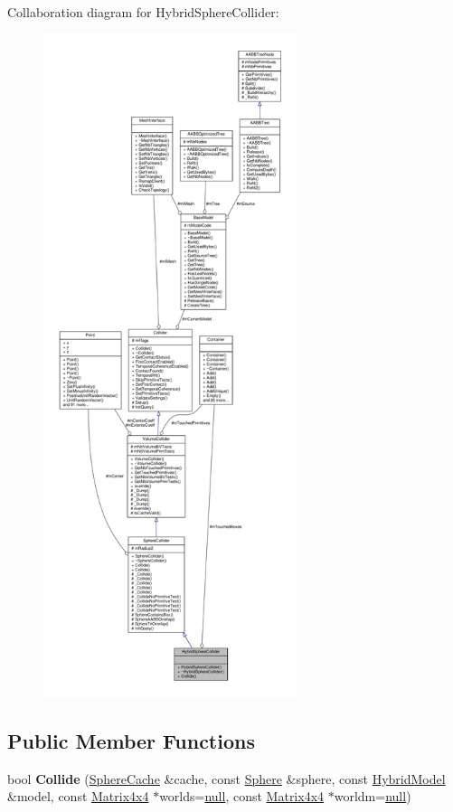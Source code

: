 Collaboration diagram for Hybrid\+Sphere\+Collider\+:
\nopagebreak
\begin{figure}[H]
\begin{center}
\leavevmode
\includegraphics[height=550pt]{de/d06/classHybridSphereCollider__coll__graph}
\end{center}
\end{figure}
\subsection*{Public Member Functions}
\begin{DoxyCompactItemize}
\item 
bool {\bfseries Collide} (\hyperlink{structSphereCache}{Sphere\+Cache} \&cache, const \hyperlink{classSphere}{Sphere} \&sphere, const \hyperlink{classHybridModel}{Hybrid\+Model} \&model, const \hyperlink{classMatrix4x4}{Matrix4x4} $\ast$worlds=\hyperlink{IceTypes_8h_ac97b8ee753e4405397a42ad5799b0f9e}{null}, const \hyperlink{classMatrix4x4}{Matrix4x4} $\ast$worldm=\hyperlink{IceTypes_8h_ac97b8ee753e4405397a42ad5799b0f9e}{null})\hypertarget{classHybridSphereCollider_ae7b7c5befe93b1cef898b2f75746edbe}{}\label{classHybridSphereCollider_ae7b7c5befe93b1cef898b2f75746edbe}

\end{DoxyCompactItemize}
